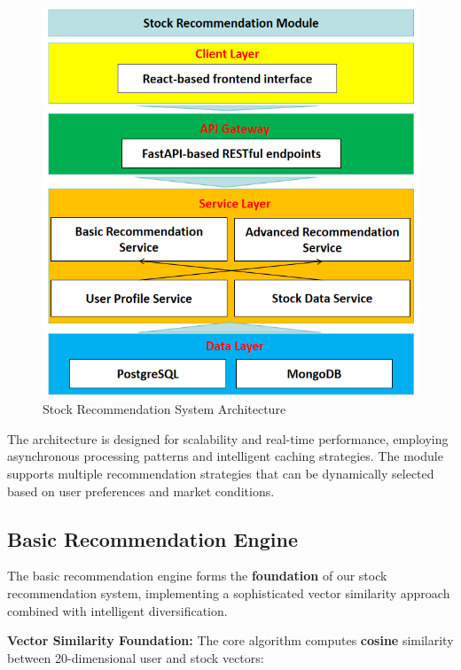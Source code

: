 \begin{figure}[ht!] %
	\centering
	\includegraphics[scale=0.8]{images/stock_recommend/recommend_overview.png}
	\caption{Stock Recommendation System Architecture}
	\label{fig:recommend_overview}
\end{figure}


The architecture is designed for scalability and real-time performance, employing asynchronous processing patterns and intelligent caching strategies. The module supports multiple recommendation strategies that can be dynamically selected based on user preferences and market conditions.

\subsection{Basic Recommendation Engine}

The basic recommendation engine forms the \textbf{foundation} of our stock recommendation system, implementing a sophisticated vector similarity approach combined with intelligent diversification.

\textbf{Vector Similarity Foundation:}
The core algorithm computes \textbf{cosine} similarity between 20-dimensional user and stock vectors:


